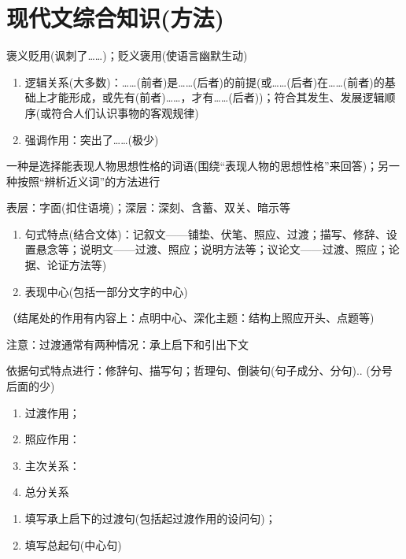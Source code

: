 \section{现代文综合知识(方法)}

褒义贬用(讽刺了\ldots{}\ldots{})；贬义褒用(使语言幽默生动)

\begin{enumerate}
\item 逻辑关系(大多数)：\ldots{}\ldots{}(前者)是\ldots{}\ldots{}(后者)的前提(或\ldots{}\ldots{}(后者)在\ldots{}\ldots{}(前者)的基础上才能形成，或先有(前者)\ldots{}\ldots{}，才有\ldots{}\ldots{}(后者))；符合其发生、发展逻辑顺序(或符合人们认识事物的客观规律)
\item 强调作用：突出了\ldots{}\ldots{}(极少)
\end{enumerate}

一种是选择能表现人物思想性格的词语(围绕``表现人物的思想性格''来回答)；另一种按照``辨析近义词''的方法进行

表层：字面(扣住语境)；深层：深刻、含蓄、双关、暗示等

\begin{enumerate}
\item 句式特点(结合文体)：记叙文——铺垫、伏笔、照应、过渡；描写、修辞、设置悬念等；说明文——过渡、照应；说明方法等；议论文——过渡、照应；论据、论证方法等)
\item 表现中心(包括一部分文字的中心)
\end{enumerate}
（结尾处的作用有内容上：点明中心、深化主题：结构上照应开头、点题等)

注意：过渡通常有两种情况：承上启下和引出下文

依据句式特点进行：修辞句、描写句；哲理句、倒装句(句子成分、分句)..
(分号后面的少)

\begin{enumerate}
\item 过渡作用；
\item 照应作用：
\item 主次关系：
\item 总分关系
\end{enumerate}

\begin{enumerate}
\item 填写承上启下的过渡句(包括起过渡作用的设问句)；
 \item 填写总起句(中心句)
\end{enumerate}

